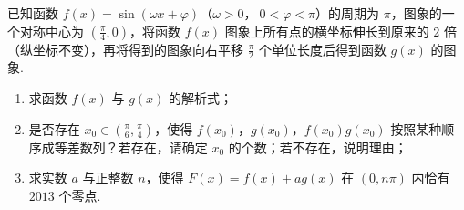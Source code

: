 \begin{problem}
已知函数 \(f(x) = \sin(\omega x + \varphi)\)（\(\omega > 0\)，\(\ 0 < \varphi < \pi\)）的周期为 \(\pi\)，图象的一个对称中心为 \(\left(\frac{\pi}{4}, 0\right)\)，将函数 \(f(x)\) 图象上所有点的横坐标伸长到原来的 \(2\) 倍（纵坐标不变），再将得到的图象向右平移 \(\frac{\pi}{2}\) 个单位长度后得到函数 \(g(x)\) 的图象.

\begin{enumerate}
\item 求函数 \(f(x)\) 与 \(g(x)\) 的解析式；
\item 是否存在 \(x_0 \in \left(\frac{\pi}{6}, \frac{\pi}{4}\right)\)，使得 \(f(x_0)\)，\(g(x_0)\)，\(f(x_0)g(x_0)\) 按照某种顺序成等差数列？若存在，请确定 \(x_0\) 的个数；若不存在，说明理由；
\item 求实数 \(a\) 与正整数 \(n\)，使得 \(F(x) = f(x) + a g(x)\) 在 \((0, n\pi)\) 内恰有 \(2013\) 个零点.
\end{enumerate}
\end{problem}

